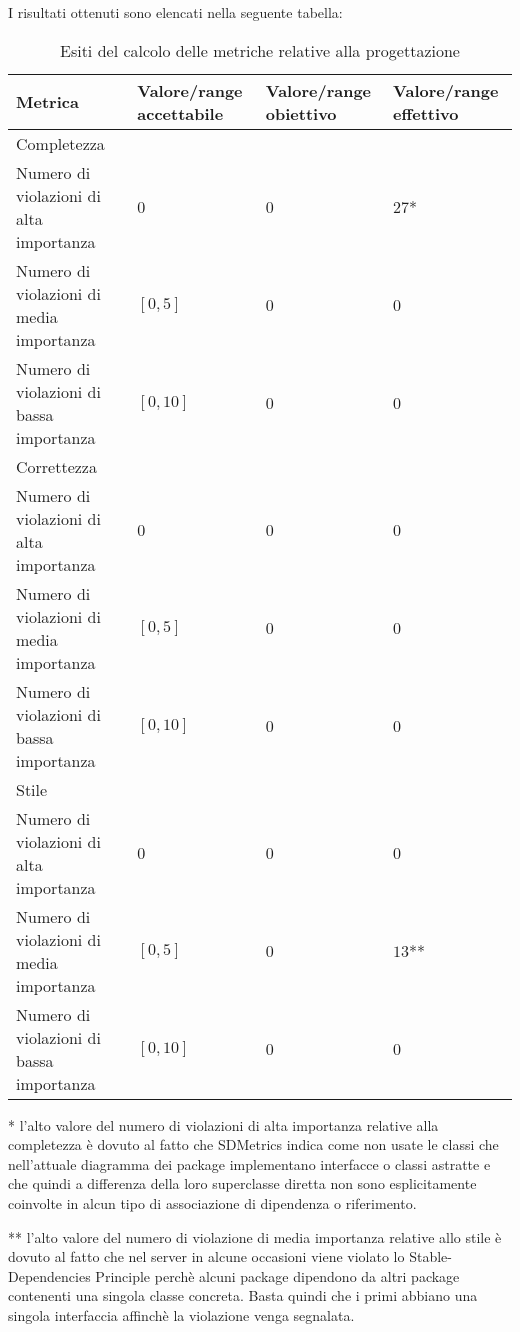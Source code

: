 		I risultati ottenuti sono elencati nella seguente tabella:
		\begin{table}[H]
		\begin{tabular}{|l|p{2.25cm}|p{2.25cm}|p{2.25cm}|}
		\hline
		\textbf{Metrica} & \textbf{Valore/range accettabile} & \textbf{Valore/range obiettivo} & \textbf{Valore/range effettivo} \\
		\hline
		Completezza & ~ & ~ & ~ \\
		Numero di violazioni di alta importanza & 0 & 0 & $27$* \\
		Numero di violazioni di media importanza & $[0, 5]$ & 0 & 0 \\
		Numero di violazioni di bassa importanza & $[0, 10]$ & 0 & 0 \\
		\hline
		Correttezza & ~ & ~ & ~ \\
		Numero di violazioni di alta importanza & 0 & 0 & 0\\
		Numero di violazioni di media importanza & $[0, 5]$ & 0 & 0 \\
		Numero di violazioni di bassa importanza & $[0, 10]$ & 0 & 0 \\
		\hline
		Stile & ~ & ~ & ~ \\
		Numero di violazioni di alta importanza & 0 & 0 & 0 \\
		Numero di violazioni di media importanza & $[0, 5]$ & 0 & $13$** \\
		Numero di violazioni di bassa importanza & $[0, 10]$ & 0 & 0 \\
		\hline
		\end{tabular}
		\caption{Esiti del calcolo delle metriche relative alla progettazione}
		\end{table}
		
		* l'alto valore del numero di violazioni di alta importanza relative alla completezza è dovuto al fatto che SDMetrics indica come non usate le classi che nell'attuale diagramma dei package implementano interfacce o classi astratte e che quindi a differenza della loro superclasse diretta non sono esplicitamente coinvolte in alcun tipo di associazione di dipendenza o riferimento.
		
		** l'alto valore del numero di violazione di media importanza relative allo stile è dovuto al fatto che nel server in alcune occasioni viene violato lo Stable-Dependencies Principle perchè alcuni package dipendono da altri package contenenti una singola classe concreta. Basta quindi che i primi abbiano una singola interfaccia affinchè la violazione venga segnalata.

